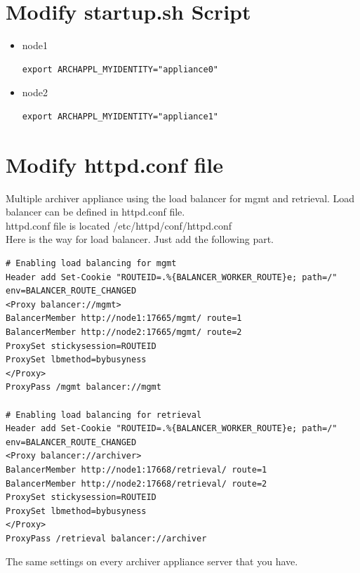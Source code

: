 \documentclass[11pt
  , a4paper
  , article
  , oneside
]{memoir}
\begin{document}
\section{Modify startup.sh Script}
\begin{itemize}
	\item node1
	\begin{lstlisting}[style=termstyle]
	export ARCHAPPL_MYIDENTITY="appliance0"
\end{lstlisting}
\item node2
	\begin{lstlisting}[style=termstyle]
	export ARCHAPPL_MYIDENTITY="appliance1"
\end{lstlisting}
\end{itemize}
\section{Modify httpd.conf file}
Multiple archiver appliance using the load balancer for mgmt and retrieval. Load balancer can be defined in httpd.conf file.\\
httpd.conf file is located /etc/httpd/conf/httpd.conf\\
Here is the way for load balancer. Just add the following part.
\begin{lstlisting}[style=termstyle]
# Enabling load balancing for mgmt
Header add Set-Cookie "ROUTEID=.%{BALANCER_WORKER_ROUTE}e; path=/" env=BALANCER_ROUTE_CHANGED
<Proxy balancer://mgmt>
BalancerMember http://node1:17665/mgmt/ route=1
BalancerMember http://node2:17665/mgmt/ route=2
ProxySet stickysession=ROUTEID
ProxySet lbmethod=bybusyness
</Proxy>
ProxyPass /mgmt balancer://mgmt

# Enabling load balancing for retrieval
Header add Set-Cookie "ROUTEID=.%{BALANCER_WORKER_ROUTE}e; path=/" env=BALANCER_ROUTE_CHANGED
<Proxy balancer://archiver>
BalancerMember http://node1:17668/retrieval/ route=1
BalancerMember http://node2:17668/retrieval/ route=2
ProxySet stickysession=ROUTEID
ProxySet lbmethod=bybusyness
</Proxy>
ProxyPass /retrieval balancer://archiver
\end{lstlisting}
The same settings on every archiver appliance server that you have.
\end{document}
